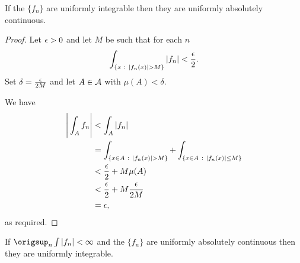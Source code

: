 \begin{claim*}
  If the $\{f_n\}$ are uniformly integrable then they are uniformly absolutely continuous.
\end{claim*}

\begin{proof}
  Let $\epsilon > 0$ and let $M$ be such that for each $n$
  \begin{align*}
    \int_{\{x ~:~ |f_n(x)| > M\}} |f_n| < \frac{\epsilon}{2}.
  \end{align*}
  Set $\delta = \frac{\epsilon}{2M}$ and let $A \in \mathcal A$ with $\mu(A) < \delta$.

  We have
  \begin{align*}
    \Bigg|\int_A f_n\Bigg|
    &< \int_A |f_n| \\
    &= \int_{\{x \in A ~:~ |f_n(x)| > M\}} + \int_{\{x \in A ~:~ |f_n(x)| \leq M\}} \\
    &< \frac{\epsilon}{2} + M\mu(A) \\
    &< \frac{\epsilon}{2} + M\frac{\epsilon}{2M} \\
    &= \epsilon,
  \end{align*}
  as required.
\end{proof}

\begin{claim*}
  If $\origsup_n \int |f_n| < \infty$ and the $\{f_n\}$ are uniformly absolutely continuous then they are
  uniformly integrable.
\end{claim*}

